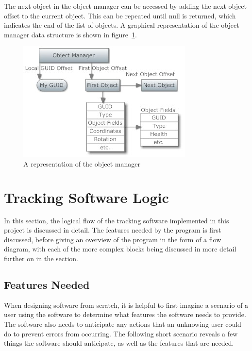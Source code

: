 The next object in the object manager can be accessed by adding the next object offset to the current object. This can be repeated until null is returned, which indicates the end of the list of objects.
A graphical representation of the object manager data structure is shown in figure~\ref{objalone}.

\begin{figure}[htbp]  %
\centering
\includegraphics[scale = 0.65]{objmanalone.jpg}	
\caption{A representation of the object manager}
\label{objalone}
\end{figure}

\lstset{language=c}
\lstset{basicstyle=\small}
\lstset{linewidth=\textwidth}
\lstset{commentstyle=\textit, stringstyle=\upshape,showspaces=false}
\lstset{frame=trBL,frameround=tttt}


\section{Tracking Software Logic}
In this section, the logical flow of the tracking software implemented in this project is discussed in detail. The features needed by the program is first discussed, before giving an overview of the program  in the form of a flow diagram, with each of the more complex blocks being discussed in more detail further on in the section.

\subsection{Features Needed}
When designing software from scratch, it is helpful to first imagine a scenario of a user using the software to determine what features the software needs to provide. The software also needs to anticipate any actions that an unknowing user could do to prevent errors from occurring. The following short scenario reveals a few things the software should anticipate, as well as the features that are needed.

